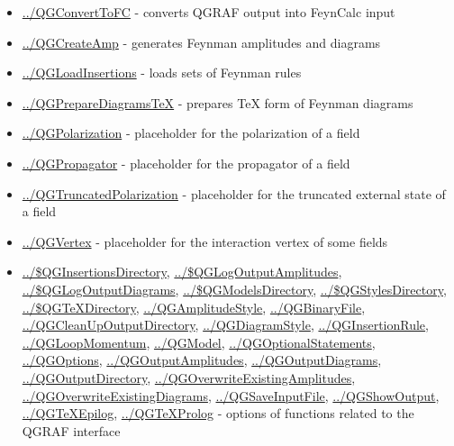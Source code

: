 \documentclass[../FeynHelpersManual.tex]{subfiles}
\begin{document}
\begin{itemize}
\tightlist
\item
  \hyperlink{../qgconverttofc}{../QGConvertToFC} - converts QGRAF output
  into FeynCalc input
\item
  \hyperlink{../qgcreateamp}{../QGCreateAmp} - generates Feynman
  amplitudes and diagrams
\item
  \hyperlink{../qgloadinsertions}{../QGLoadInsertions} - loads sets of
  Feynman rules
\item
  \hyperlink{../qgpreparediagramstex}{../QGPrepareDiagramsTeX} -
  prepares TeX form of Feynman diagrams
\item
  \hyperlink{../qgpolarization}{../QGPolarization} - placeholder for the
  polarization of a field
\item
  \hyperlink{../qgpropagator}{../QGPropagator} - placeholder for the
  propagator of a field
\item
  \hyperlink{../qgtruncatedpolarization}{../QGTruncatedPolarization} -
  placeholder for the truncated external state of a field
\item
  \hyperlink{../qgvertex}{../QGVertex} - placeholder for the interaction
  vertex of some fields
\item
  \hyperlink{../dollarqginsertionsdirectory}{../\$QGInsertionsDirectory},
  \hyperlink{../dollarqglogoutputamplitudes}{../\$QGLogOutputAmplitudes},
  \hyperlink{../dollarqglogoutputdiagrams}{../\$QGLogOutputDiagrams},
  \hyperlink{../dollarqgmodelsdirectory}{../\$QGModelsDirectory},
  \hyperlink{../dollarqgstylesdirectory}{../\$QGStylesDirectory},
  \hyperlink{../dollarqgtexdirectory}{../\$QGTeXDirectory},
  \hyperlink{../qgamplitudestyle}{../QGAmplitudeStyle},
  \hyperlink{../qgbinaryfile}{../QGBinaryFile},
  \hyperlink{../qgcleanupoutputdirectory}{../QGCleanUpOutputDirectory},
  \hyperlink{../qgdiagramstyle}{../QGDiagramStyle},
  \hyperlink{../qginsertionrule}{../QGInsertionRule},
  \hyperlink{../qgloopmomentum}{../QGLoopMomentum},
  \hyperlink{../qgmodel}{../QGModel},
  \hyperlink{../qgoptionalstatements}{../QGOptionalStatements},
  \hyperlink{../qgoptions}{../QGOptions},
  \hyperlink{../qgoutputamplitudes}{../QGOutputAmplitudes},
  \hyperlink{../qgoutputdiagrams}{../QGOutputDiagrams},
  \hyperlink{../qgoutputdirectory}{../QGOutputDirectory},
  \hyperlink{../qgoverwriteexistingamplitudes}{../QGOverwriteExistingAmplitudes},
  \hyperlink{../qgoverwriteexistingdiagrams}{../QGOverwriteExistingDiagrams},
  \hyperlink{../qgsaveinputfile}{../QGSaveInputFile},
  \hyperlink{../qgshowoutput}{../QGShowOutput},
  \hyperlink{../qgtexepilog}{../QGTeXEpilog},
  \hyperlink{../qgtexprolog}{../QGTeXProlog} - options of functions
  related to the QGRAF interface
\end{itemize}
\end{document}
